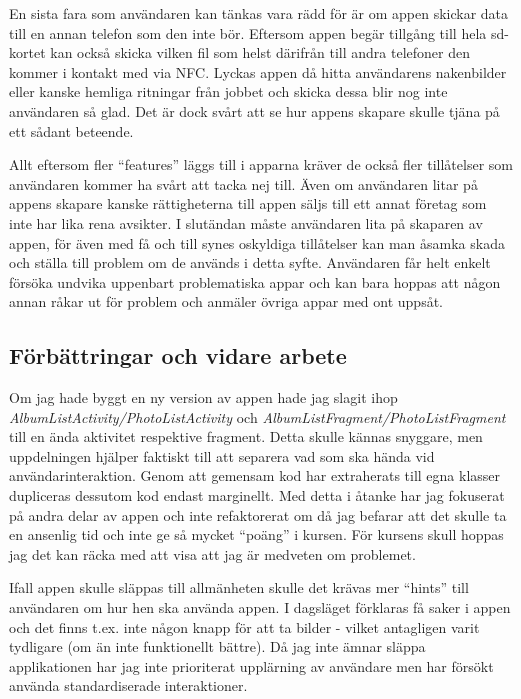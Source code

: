 \documentclass[11px, a4paper, twocolumn]{article}
\begin{document}
	En sista fara som användaren kan tänkas vara rädd för är om appen skickar data till en annan telefon som den inte bör. Eftersom appen begär tillgång till hela sd-kortet kan också skicka vilken fil som helst därifrån till andra telefoner den kommer i kontakt med via NFC. Lyckas appen då hitta användarens nakenbilder eller kanske hemliga ritningar från jobbet och skicka dessa blir nog inte användaren så glad. Det är dock svårt att se hur appens skapare skulle tjäna på ett sådant beteende.

	Allt eftersom fler ``features'' läggs till i apparna kräver de också fler tillåtelser som användaren kommer ha svårt att tacka nej till. Även om användaren litar på appens skapare kanske rättigheterna till appen säljs till ett annat företag som inte har lika rena avsikter. I slutändan måste användaren lita på skaparen av appen, för även med få och till synes oskyldiga tillåtelser kan man åsamka skada och ställa till problem om de används i detta syfte. Användaren får helt enkelt försöka undvika uppenbart problematiska appar och kan bara hoppas att någon annan råkar ut för problem och anmäler övriga appar med ont uppsåt.


\subsection{Förbättringar och vidare arbete}

	Om jag hade byggt en ny version av appen hade jag slagit ihop \emph{AlbumListActivity/PhotoListActivity} och \emph{AlbumListFragment/PhotoListFragment} till en ända aktivitet respektive fragment. Detta skulle kännas snyggare, men uppdelningen hjälper faktiskt till att separera vad som ska hända vid användarinteraktion. Genom att gemensam kod har extraherats till egna klasser dupliceras dessutom kod endast marginellt. Med detta i åtanke har jag fokuserat på andra delar av appen och inte refaktorerat om då jag befarar att det skulle ta en ansenlig tid och inte ge så mycket ``poäng'' i kursen. För kursens skull hoppas jag det kan räcka med att visa att jag är medveten om problemet.

	Ifall appen skulle släppas till allmänheten skulle det krävas mer ``hints'' till användaren om hur hen ska använda appen. I dagsläget förklaras få saker i appen och det finns t.ex. inte någon knapp för att ta bilder - vilket antagligen varit tydligare (om än inte funktionellt bättre). Då jag inte ämnar släppa applikationen har jag inte prioriterat upplärning av användare men har försökt använda standardiserade interaktioner.
\end{document}
